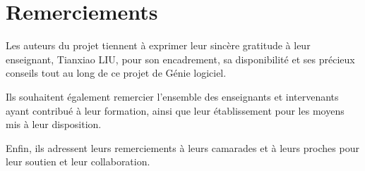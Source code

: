 \documentclass[11pt, french]{article}
\begin{document}


\tableofcontents
\listoftables

\newpage
\section*{Remerciements}

Les auteurs du projet tiennent à exprimer leur sincère gratitude à leur enseignant, Tianxiao LIU, pour son encadrement, sa disponibilité et ses précieux conseils tout au long de ce projet de Génie logiciel.

Ils souhaitent également remercier l'ensemble des enseignants et intervenants ayant contribué à leur formation, ainsi que leur établissement pour les moyens mis à leur disposition.

Enfin, ils adressent leurs remerciements à leurs camarades et à leurs proches pour leur soutien et leur collaboration.








\newpage


\nocite{*}
\end{document}
